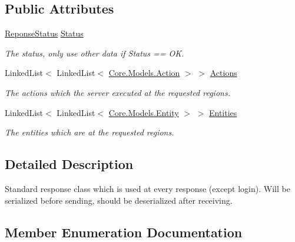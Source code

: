 \subsection*{Public Attributes}
\begin{DoxyCompactItemize}
\item 
\hyperlink{classCore_1_1Connections_1_1Response_a87c0ec7f5f782b30edebe2098acabab0}{Reponse\+Status} \hyperlink{classCore_1_1Connections_1_1Response_aa9f4fef77b99465a399e0af5111609ef}{Status}
\begin{DoxyCompactList}\small\item\em The status, only use other data if Status == O\+K. \end{DoxyCompactList}\item 
Linked\+List$<$ Linked\+List$<$ \hyperlink{classCore_1_1Models_1_1Action}{Core.\+Models.\+Action} $>$ $>$ \hyperlink{classCore_1_1Connections_1_1Response_a4464e6ff81ca7d159485536b1f5edeec}{Actions}
\begin{DoxyCompactList}\small\item\em The actions which the server executed at the requested regions. \end{DoxyCompactList}\item 
Linked\+List$<$ Linked\+List$<$ \hyperlink{classCore_1_1Models_1_1Entity}{Core.\+Models.\+Entity} $>$ $>$ \hyperlink{classCore_1_1Connections_1_1Response_a3e678090e1fb696f0e3c7dfaca9b1275}{Entities}
\begin{DoxyCompactList}\small\item\em The entities which are at the requested regions. \end{DoxyCompactList}\end{DoxyCompactItemize}


\subsection{Detailed Description}
Standard response class which is used at every response (except login). Will be serialized before sending, should be deserialized after receiving. 



\subsection{Member Enumeration Documentation}
\hypertarget{classCore_1_1Connections_1_1Response_a87c0ec7f5f782b30edebe2098acabab0}{}
